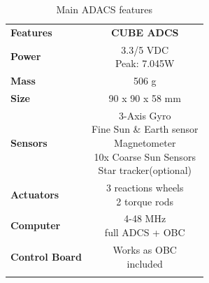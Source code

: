 \begin{longtable}{| l | c |}
	
	\hline
	\rowcolor[gray]{0.60} \multicolumn{2}{|c|}{\textbf{ADACS}} \\
	\hline
	
	\hline
	\rowcolor[gray]{0.75}	\textbf{Features} &  \textbf{CUBE ADCS} \\
	\hline
	
	\cellcolor[gray]{0.85} \textbf{Power} &\makecell{3.3/5 VDC\\ Peak: 7.045W }  \\ 	\hline
	\cellcolor[gray]{0.85} \textbf{Mass} & 506 g\\ \hline
	\cellcolor[gray]{0.85} \textbf{Size} & 90 x 90 x 58 mm \\ \hline
	\cellcolor[gray]{0.85} \textbf{Sensors} & \makecell{3-Axis Gyro\\Fine Sun \& Earth sensor \\ Magnetometer\\10x Coarse Sun Sensors \\Star tracker(optional)}\\ 	\hline
	\cellcolor[gray]{0.85} \textbf{Actuators} &  \makecell{3 reactions wheels\\2 torque rods}\\ 	\hline
	\cellcolor[gray]{0.85} \textbf{Computer} &\makecell{4-48 MHz\\ full ADCS + OBC}   \\ \hline
	\cellcolor[gray]{0.85} \textbf{Control Board} & \makecell{Works as OBC\\included}\\
	\hline
	
	\caption{Main ADACS features}
	\label{ADACS}
	
\end{longtable}
\clearpage
{}
